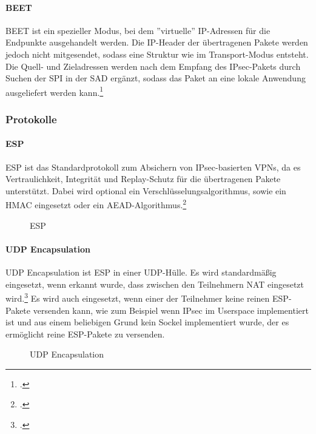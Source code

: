 \paragraph{BEET}
\ac{BEET} ist ein spezieller Modus, bei dem ''virtuelle'' \ac{IP}-Adressen für die Endpunkte
ausgehandelt werden. Die \ac{IP}-Header der übertragenen Pakete werden jedoch nicht mitgesendet,
sodass eine Struktur wie im Transport-Modus entsteht. Die Quell- und Zieladressen
werden nach dem Empfang des \ac{IPsec}-Pakets durch Suchen der \ac{SPI} in der \ac{SAD}
ergänzt, sodass das Paket an eine lokale Anwendung ausgeliefert werden kann.\footcite[Appendix B][]{petri_jokela_rfc_2015}

\subsubsection{Protokolle}

\paragraph{ESP}
\ac{ESP} ist das Standardprotokoll zum Absichern von \ac{IPsec}-basierten \acp{VPN},
da es Vertraulichkeit, Integrität und Replay-Schutz für die übertragenen Pakete unterstützt.
Dabei wird optional ein Verschlüsselungsalgorithmus, sowie ein \ac{HMAC} eingesetzt oder
ein \ac{AEAD}-Algorithmus.\footcite[][]{stephen_kent_rfc_2005-2}
\begin{figure}[h!]
    \label{fig:ESP}
    \centering
    \def\svgwidth{\columnwidth}
    
    \caption{\ac{ESP}}
\end{figure}

\paragraph{UDP Encapsulation}
UDP Encapsulation ist \ac{ESP} in einer UDP-Hülle. Es wird standardmäßig eingesetzt, wenn
erkannt wurde, dass zwischen den Teilnehmern \ac{NAT} eingesetzt wird.\footcite[][]{markus_stenberg_rfc_2005}
Es wird auch eingesetzt, wenn einer der Teilnehmer keine reinen \ac{ESP}-Pakete versenden kann,
wie zum Beispiel wenn \ac{IPsec} im Userspace implementiert ist und aus einem beliebigen Grund
kein Sockel implementiert wurde, der es ermöglicht reine \ac{ESP}-Pakete zu versenden.
\begin{figure}[h!]
    \label{fig:UDP-Encapsulation}
    \centering
    \def\svgwidth{\columnwidth}
    
    \caption{UDP Encapsulation}
\end{figure}

